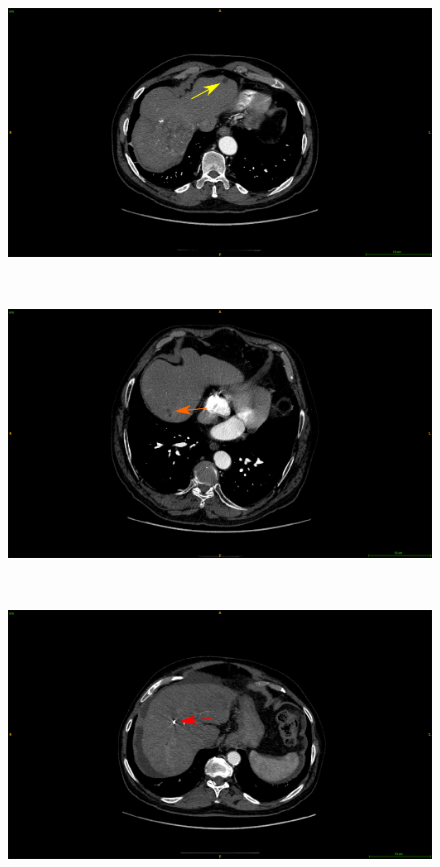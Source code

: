{\begin{figure}[!ht]
	\begin{mdframed}[backgroundcolor=blue!50,linecolor=blue!50]
		\centering
		\begin{minipage}{0.45\linewidth}
			\includegraphics[width=\linewidth]{images/Artifacts/GDB_cyst}
		\end{minipage} \\
		\begin{minipage}{0.45\linewidth}
			\includegraphics[width=\linewidth]{images/Artifacts/GDB_fat}
		\end{minipage} \\
		\begin{minipage}{0.45\linewidth}
			\includegraphics[width=\linewidth]{images/Artifacts/GDB_metallic_artifacts}

\end{minipage}
\end{mdframed}
\end{figure}}

